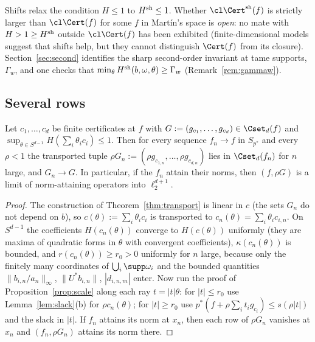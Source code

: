 \begin{remark}\label{rem:shiftopen}
Shifts relax the condition $H\le1$ to $H^{\rm sh}\le1$.  Whether
$\cl\Cert^{\rm sh}(f)$ is strictly larger than $\cl\Cert(f)$ for some $f$ in
Mart\'in's space is \emph{open}: no mate with $H>1\ge H^{\rm sh}$ outside
$\cl\Cert(f)$ has been exhibited (finite-dimensional models suggest that
shifts help, but they cannot distinguish $\Cert(f)$ from its closure).
Section~\ref{sec:second} identifies the sharp second-order invariant at
tame supports, $\Gamma_w$, and one checks that $\min_\theta H^{\rm
sh}(b,\omega,\theta)\ge\Gamma_w$ (Remark~\ref{rem:gammaw}).
\end{remark}

\subsection{Several rows}

\begin{theorem}\label{thm:joint}
Let $c_1,\dots,c_d$ be finite certificates at $f$ with
$G:=(g_{c_1},\dots,g_{c_d})\in\Cset_d(f)$ and
$\sup_{\theta\in S^{d-1}}H(\sum_i\theta_ic_i)\le1$.  Then for every sequence
$f_n\to f$ in $S_{p^*}$ and every $\rho<1$ the transported tuple
$\rho G_n:=(\rho g_{c_{1,n}},\dots,\rho g_{c_{d,n}})$ lies in $\Cset_d(f_n)$
for $n$ large, and $G_n\to G$.  In particular, if the $f_n$ attain their
norms, then $(f,\rho G)$ is a limit of norm-attaining operators into
$\ell_2^{d+1}$.
\end{theorem}

\begin{proof}
The construction of Theorem~\ref{thm:transport} is linear in $c$ (the sets
$G_n$ do not depend on $b$), so $c(\theta):=\sum_i\theta_ic_i$ is
transported to $c_n(\theta)=\sum_i\theta_ic_{i,n}$.  On $S^{d-1}$ the
coefficients $H(c_n(\theta))$ converge to $H(c(\theta))$ uniformly (they
are maxima of quadratic forms in $\theta$ with convergent coefficients),
$\kappa(c_n(\theta))$ is bounded, and $r(c_n(\theta))\ge r_0>0$ uniformly
for $n$ large, because only the finitely many coordinates of
$\bigcup_i\supp\omega_i$ and the bounded quantities
$\|b_{i,n}/a_n\|_\infty$, $\|U^*b_{i,n}\|$, $|d_{i,n,m}|$ enter.  Now run
the proof of Proposition~\ref{prop:scale} along each ray $t=|t|\theta$:
for $|t|\le r_0$ use Lemma~\ref{lem:slack}(b) for $\rho c_n(\theta)$; for
$|t|\ge r_0$ use $p^*(f+\rho\sum_it_ig_{c_i})\le s(\rho|t|)$ and the slack
in $|t|$.  If $f_n$ attains its norm at $x_n$, then each row of $\rho G_n$
vanishes at $x_n$ and $(f_n,\rho G_n)$ attains its norm there.
\end{proof}

